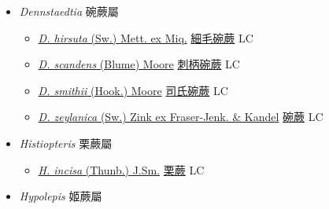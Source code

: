 
  \begin{itemize}
 \item[] \textit{Dennstaedtia} 碗蕨屬
                    
  \begin{itemize}
        \item[] \href{http://www.theplantlist.org/tpl1.1/search?q=Dennstaedtia+hirsuta}{\textit{D. hirsuta} (Sw.) Mett. ex Miq.}   \href{\detokenize{http://taibnet.sinica.edu.tw/chi/taibnet_species_list.php?T2=細毛碗蕨&T2_new_value=true&fr=y}}{細毛碗蕨} LC
        \item[] \href{http://www.theplantlist.org/tpl1.1/search?q=Dennstaedtia+scandens}{\textit{D. scandens} (Blume) Moore}   \href{\detokenize{http://taibnet.sinica.edu.tw/chi/taibnet_species_list.php?T2=刺柄碗蕨&T2_new_value=true&fr=y}}{刺柄碗蕨} LC
        \item[] \href{http://www.theplantlist.org/tpl1.1/search?q=Dennstaedtia+smithii}{\textit{D. smithii} (Hook.) Moore}   \href{\detokenize{http://taibnet.sinica.edu.tw/chi/taibnet_species_list.php?T2=司氏碗蕨&T2_new_value=true&fr=y}}{司氏碗蕨} LC
        \item[] \href{http://www.theplantlist.org/tpl1.1/search?q=Dennstaedtia+zeylanica}{\textit{D. zeylanica} (Sw.) Zink ex Fraser-Jenk. \& Kandel}     \href{\detokenize{http://taibnet.sinica.edu.tw/chi/taibnet_species_list.php?T2=碗蕨&T2_new_value=true&fr=y}}{碗蕨} LC
  \end{itemize}
 \item[] \textit{Histiopteris} 栗蕨屬
                    
  \begin{itemize}
        \item[] \href{http://www.theplantlist.org/tpl1.1/search?q=Histiopteris+incisa}{\textit{H. incisa} (Thunb.) J.Sm.}   \href{\detokenize{http://taibnet.sinica.edu.tw/chi/taibnet_species_list.php?T2=栗蕨&T2_new_value=true&fr=y}}{栗蕨} LC
  \end{itemize}
 \item[] \textit{Hypolepis} 姬蕨屬
                    

\end{itemize}
